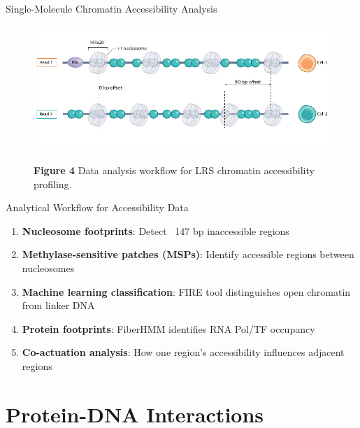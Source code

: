 \documentclass[aspectratio=169]{beamer}
\begin{document}
\begin{frame}{Single-Molecule Chromatin Accessibility Analysis}
  \begin{figure}
    \centering
    \includegraphics[height=0.5\textheight]{figures/fig4a.pdf}

    {\small \textbf{Figure 4} \textbar{} Data analysis workflow for LRS chromatin accessibility profiling.}
  \end{figure}
\end{frame}

\begin{frame}{Analytical Workflow for Accessibility Data}
  \begin{enumerate}
    \item \textbf{Nucleosome footprints}: Detect ~147 bp inaccessible regions

    \item \textbf{Methylase-sensitive patches (MSPs)}: Identify accessible regions between nucleosomes

    \item \textbf{Machine learning classification}: FIRE tool distinguishes open chromatin from linker DNA

    \item \textbf{Protein footprints}: FiberHMM identifies RNA Pol/TF occupancy

    \item \textbf{Co-actuation analysis}: How one region's accessibility influences adjacent regions
  \end{enumerate}
\end{frame}

\section{Protein-DNA Interactions}
\end{document}

